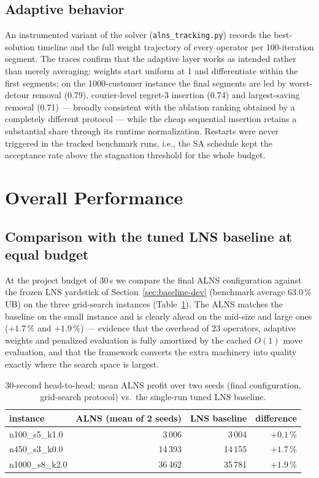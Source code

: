 \documentclass[10pt, a4paper]{article}
\newcommand{\ub}{\%\,UB}
\begin{document}
\subsection{Adaptive behavior}\label{sec:track}
An instrumented variant of the solver (\texttt{alns\_tracking.py}) records
the best-solution timeline and the full weight trajectory of every operator
per 100-iteration segment. The traces confirm that the adaptive layer works
as intended rather than merely averaging: weights start uniform at 1 and
differentiate within the first segments; on the 1000-customer instance the
final segments are led by worst-detour removal (0.79), courier-level
regret-3 insertion (0.74) and largest-saving removal (0.71) --- broadly
consistent with the ablation ranking obtained by a completely different
protocol --- while the cheap sequential insertion retains a substantial
share through its runtime normalization. Restarts were never triggered in
the tracked benchmark runs, i.e., the SA schedule kept the acceptance rate
above the stagnation threshold for the whole budget.

\section{Overall Performance}\label{sec:overall}

\subsection{Comparison with the tuned LNS baseline at equal budget}
At the project budget of 30\,s we compare the final ALNS configuration
against the frozen LNS yardstick of Section~\ref{sec:baseline-dev}
(benchmark average 63.0\,\ub) on the three grid-search instances
(Table~\ref{tab:head2head}). The ALNS matches the baseline on the small
instance and is clearly ahead on the mid-size and large ones ($+1.7\,\%$ and
$+1.9\,\%$) --- evidence that the overhead of 23 operators, adaptive weights
and penalized evaluation is fully amortized by the cached $O(1)$ move
evaluation, and that the framework converts the extra machinery into
quality exactly where the search space is largest.

\begin{table}[t]
\centering\small
\caption{30-second head-to-head: mean ALNS profit over two seeds
(final configuration, grid-search protocol) vs.\ the single-run tuned LNS
baseline.}
\label{tab:head2head}
\begin{tabular}{lrrr}
\toprule
instance & ALNS (mean of 2 seeds) & LNS baseline & difference \\
\midrule
n100\_s5\_k1.0  &  3\,006 &  3\,004 & $+0.1\,\%$ \\
n450\_s3\_k0.0  & 14\,393 & 14\,155 & $+1.7\,\%$ \\
n1000\_s8\_k2.0 & 36\,462 & 35\,781 & $+1.9\,\%$ \\
\bottomrule
\end{tabular}
\end{table}
\end{document}
